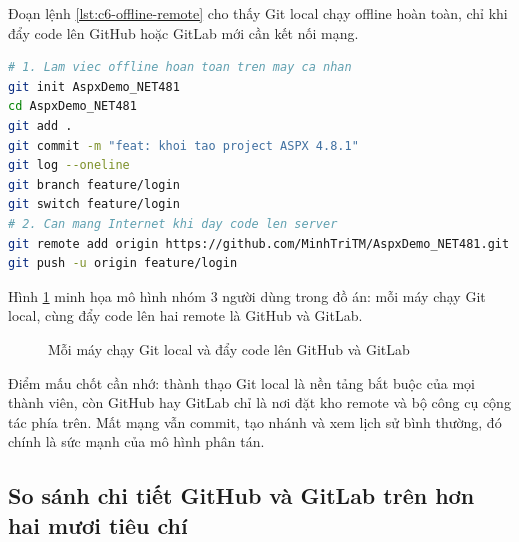 Đoạn lệnh \ref{lst:c6-offline-remote} cho thấy Git local chạy offline hoàn toàn,
chỉ khi đẩy code lên GitHub hoặc GitLab mới cần kết nối mạng.

\begin{lstlisting}[language=bash,caption={Git local lam viec offline, day len remote moi can mang},label={lst:c6-offline-remote}]
# 1. Lam viec offline hoan toan tren may ca nhan
git init AspxDemo_NET481
cd AspxDemo_NET481
git add .
git commit -m "feat: khoi tao project ASPX 4.8.1"
git log --oneline
git branch feature/login
git switch feature/login
# 2. Can mang Internet khi day code len server
git remote add origin https://github.com/MinhTriTM/AspxDemo_NET481.git
git push -u origin feature/login
\end{lstlisting}

Hình \ref{fig:c6-local-remote} minh họa mô hình nhóm 3 người dùng trong đồ án:
mỗi máy chạy Git local, cùng đẩy code lên hai remote là GitHub và GitLab.

\begin{figure}[H]
\centering
{}
\caption{Mỗi máy chạy Git local và đẩy code lên GitHub và GitLab}
\label{fig:c6-local-remote}
\end{figure}

Điểm mấu chốt cần nhớ: thành thạo Git local là nền tảng bắt buộc của mọi thành viên,
còn GitHub hay GitLab chỉ là nơi đặt kho remote và bộ công cụ cộng tác phía trên.
Mất mạng vẫn commit, tạo nhánh và xem lịch sử bình thường, đó chính là sức mạnh của mô hình phân tán.

\subsection{So sánh chi tiết GitHub và GitLab trên hơn hai mươi tiêu chí}

